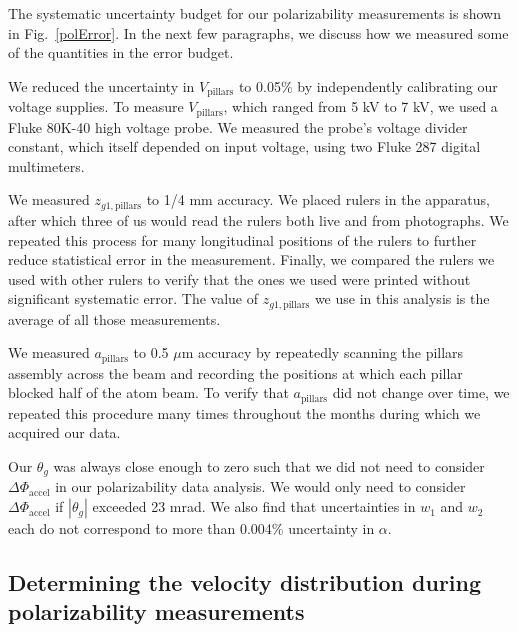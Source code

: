 \documentclass[twocolumn,pra,showpacs,superscriptaddress,longbibliography]{revtex4-1}   %
\newcommand{\figref}[1]{Fig.~\ref{#1}}
\newcommand{\dphiaccel}{\Delta\Phi_{\mathrm{accel}}}
\begin{document}
The systematic uncertainty budget for our polarizability measurements is shown in \figref{polError}. In the next few paragraphs, we discuss how we measured some of the quantities in the error budget.

We reduced the uncertainty in $V_{\mathrm{pillars}}$ to 0.05\% by independently calibrating our voltage supplies. To measure $V_{\mathrm{pillars}}$, which ranged from 5 kV to 7 kV, we used a Fluke 80K-40 high voltage probe. We measured the probe's voltage divider constant, which itself depended on input voltage, using two Fluke 287 digital multimeters.

We measured $z_{g1,\mathrm{pillars}}$ to 1/4 mm accuracy. We placed rulers in the apparatus, after which three of us  would read the rulers both live and from photographs. We repeated this process for many longitudinal positions of the rulers to further reduce statistical error in the measurement. Finally, we compared the rulers we used with other rulers to verify that the ones we used were printed without significant systematic error. The value of $z_{g1,\mathrm{pillars}}$ we use in this analysis is the average of all those measurements. 

We measured $a_{\mathrm{pillars}}$ to 0.5 $\mu$m accuracy by repeatedly scanning the pillars assembly across the beam and recording the positions at which each pillar blocked half of the atom beam. 
To verify that $a_{\mathrm{pillars}}$ did not change over time, we repeated this procedure many times throughout the months during which we acquired our data.


Our $\theta_g$ was always close enough to zero such that we did not need to consider $\dphiaccel$ in our polarizability data analysis. We would only need to consider $\dphiaccel$ if $|\theta_g|$ exceeded 23 mrad.
We also find that uncertainties in $w_1$ and $w_2$ each do not correspond to more than 0.004\% uncertainty in $\alpha$.

\subsection{Determining the velocity distribution during polarizability measurements} \label{sectionDeterminingv0vr}
\end{document}
